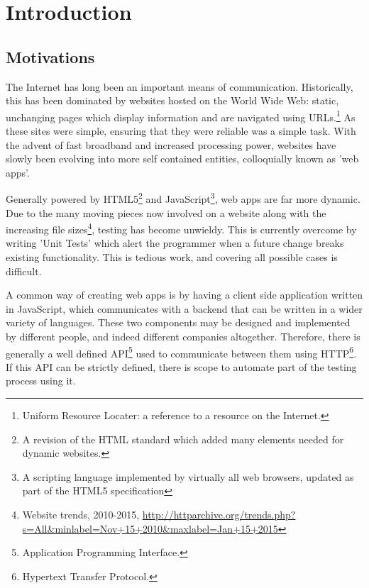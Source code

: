 \chapter{Introduction}

\section{Motivations}
The Internet has long been an important means of communication. Historically, this has been dominated by websites hosted on the World Wide Web: static, unchanging pages which display information and are navigated using URLs.\footnote{Uniform Resource Locater: a reference to a resource on the Internet.} As these sites were simple, ensuring that they were reliable was a simple task. With the advent of fast broadband and increased processing power, websites have slowly been evolving into more self contained entities, colloquially known as 'web apps'. 

Generally powered by HTML5\footnote{A revision of the HTML standard which added many elements needed for dynamic websites.}\cite{html5website} and JavaScript\footnote{A scripting language implemented by virtually all web browsers, updated as part of the HTML5 specification}, web apps are far more dynamic. Due to the many moving pieces now involved on a website along with the increasing file sizes\footnote{Website trends, 2010-2015, \url{http://httparchive.org/trends.php?s=All&minlabel=Nov+15+2010&maxlabel=Jan+15+2015}}, testing has become unwieldy. This is currently overcome by writing 'Unit Tests'\cite{ieeetesting} which alert the programmer when a future change breaks existing functionality. This is tedious work, and covering all possible cases is difficult.

A common way of creating web apps is by having a client side application written in JavaScript, which communicates with a backend that can be written in a wider variety of languages. These two components may be designed and implemented by different people, and indeed different companies altogether. Therefore, there is generally a well defined API\footnote{Application Programming Interface.} used to communicate between them using HTTP\footnote{Hypertext Transfer Protocol.}. If this API can be strictly defined, there is scope to automate part of the testing process using it.

